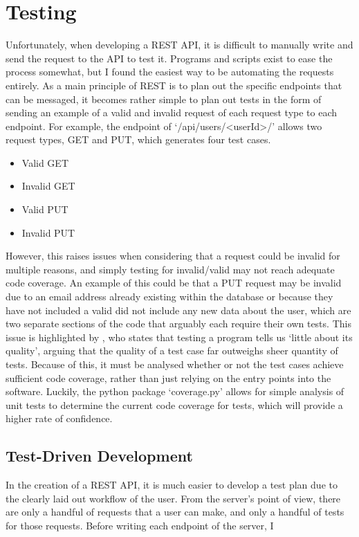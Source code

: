 \section{Testing}
Unfortunately, when developing a REST API, it is difficult to manually write and send the request to the API to test it.
Programs and scripts exist to ease the process somewhat, but I found the easiest way to be automating the requests entirely. 
As a main principle of REST is to plan out the specific endpoints that can be messaged, it becomes rather simple to plan out tests in the form of sending an example of a valid and invalid request of each request type to each endpoint.
For example, the endpoint of `/api/users/<userId>/' allows two request types, GET and PUT, which generates four test cases.
\begin{itemize}
	\item{Valid GET}
	\item{Invalid GET}
	\item{Valid PUT}
	\item{Invalid PUT}
\end{itemize}  

However, this raises issues when considering that a request could be invalid for multiple reasons, and simply testing for invalid/valid may not reach adequate code coverage.
An example of this could be that a PUT request may be invalid due to an email address already existing within the database or because they have not included a valid did not include any new data about the user, which are two separate sections of the code that arguably each require their own tests.
This issue is highlighted by \cite{4597151}, who states that testing a program tells us `little about its quality', arguing that the quality of a test case far outweighs sheer quantity of tests.
Because of this, it must be analysed whether or not the test cases achieve sufficient code coverage, rather than just relying on the entry points into the software.
Luckily, the python package `coverage.py' allows for simple analysis of unit tests to determine the current code coverage for tests, which will provide a higher rate of confidence.

\subsection{Test-Driven Development}
In the creation of a REST API, it is much easier to develop a test plan due to the clearly laid out workflow of the user. From the server's point of view, there are only a handful of requests that a user can make, and only a handful of tests for those requests. Before writing each endpoint of the server, I 

